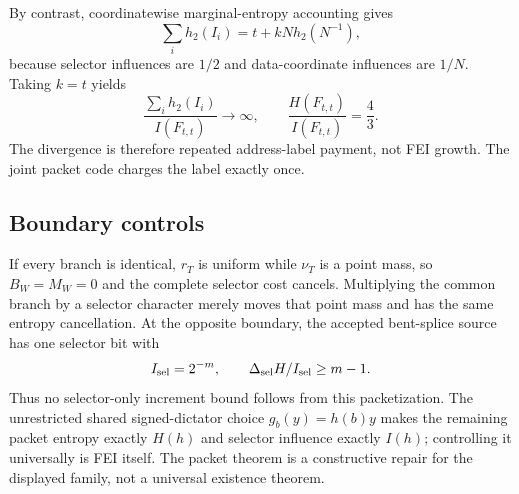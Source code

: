 By contrast, coordinatewise marginal-entropy accounting gives
\[
\sum_i h_2(I_i)=t+kN h_2(N^{-1}),
\]
because selector influences are $1/2$ and data-coordinate influences are
$1/N$.  Taking $k=t$ yields
\[
\frac{\sum_i h_2(I_i)}{I(F_{t,t})}\longrightarrow\infty,
\qquad
\frac{H(F_{t,t})}{I(F_{t,t})}=\frac43.
\]
The divergence is therefore repeated address-label payment, not FEI
growth.  The joint packet code charges the label exactly once.

\subsection*{Boundary controls}

If every branch is identical, $r_T$ is uniform while $\nu_T$ is a point
mass, so $B_W=M_W=0$ and the complete selector cost cancels.  Multiplying
the common branch by a selector character merely moves that point mass and
has the same entropy cancellation.  At the opposite boundary, the accepted
bent-splice source has one selector bit with
\[
I_{\rm sel}=2^{-m},\qquad
\Delta_{\rm sel}H/I_{\rm sel}\ge m-1.
\]
Thus no selector-only increment bound follows from this packetization.
The unrestricted shared signed-dictator choice $g_b(y)=h(b)y$ makes the
remaining packet entropy exactly $H(h)$ and selector influence exactly
$I(h)$; controlling it universally is FEI itself.  The packet theorem is a
constructive repair for the displayed family, not a universal existence
theorem.
